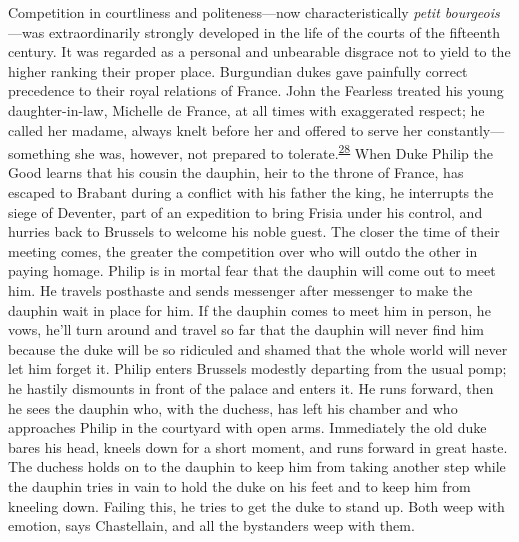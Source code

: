 \protect\hypertarget{09_Chapter_Two__THE_CRAVING_FOR_A_M.xhtmlux5cux23page_46}{}{}Competition
in courtliness and politeness---now characteristically \emph{petit
bourgeois}---was extraordinarily strongly developed in the life of the
courts of the fifteenth century. It was regarded as a personal and
unbearable disgrace not to yield to the higher ranking their proper
place. Burgundian dukes gave painfully correct precedence to their royal
relations of France. John the Fearless treated his young
daughter-in-law, Michelle de France, at all times with exaggerated
respect; he called her madame, always knelt before her and offered to
serve her constantly---something she was, however, not prepared to
tolerate.\textsuperscript{\protect\hypertarget{09_Chapter_Two__THE_CRAVING_FOR_A_M.xhtmlux5cux23id_2031}{\protect\hyperlink{23_NOTES.xhtmlux5cux23id_2032}{28}}}
When Duke Philip the Good learns that his cousin the dauphin, heir to
the throne of France, has escaped to Brabant during a conflict with his
father the king, he interrupts the siege of Deventer, part of an
expedition to bring Frisia under his control, and hurries back to
Brussels to welcome his noble guest. The closer the time of their
meeting comes, the greater the competition over who will outdo the other
in paying homage. Philip is in mortal fear that the dauphin will come
out to meet him. He travels posthaste and sends messenger after
messenger to make the dauphin wait in place for him. If the dauphin
comes to meet him in person, he vows, he'll turn around and travel so
far that the dauphin will never find him because the duke will be so
ridiculed and shamed that the whole world will never let him forget it.
Philip enters Brussels modestly departing from the usual pomp; he
hastily dismounts in front of the palace and enters it. He runs forward,
then he sees the dauphin who, with the duchess, has left his chamber and
who approaches Philip in the courtyard with open arms. Immediately the
old duke bares his head, kneels down for a short moment, and runs
forward in great haste. The duchess holds on to the dauphin to keep him
from taking another step while the dauphin tries in vain to hold the
duke on his feet and to keep him from kneeling down. Failing this, he
tries to get the duke to stand up. Both weep with emotion, says
Chastellain, and all the bystanders weep with them.

